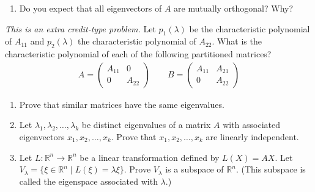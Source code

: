 \documentclass[12pt]{article}
\theoremstyle{remark}
\newtheorem*{solution}{Solution}
\newcommand{\R}{\mathbb{R}}
\renewcommand{\=}{&=&}
\newcommand{\<}{\langle}
\renewcommand{\>}{\rangle}
\newcommand{\bmat}{\begin{pmatrix}}
\newcommand{\emat}{\end{pmatrix}}
\newcommand{\beq}{\begin{eqnarray*}}
\newcommand{\eeq}{\end{eqnarray*}}
\begin{document}
\begin{problems}
\begin{enumerate}
	
	\item Do you expect that all eigenvectors of $A$ are mutually orthogonal? Why?
	
\end{enumerate}



\item
\emph{This is an extra credit-type problem.}
Let $p_1(\lambda)$ be the characteristic polynomial of $A_{11}$ and $p_2(\lambda)$ the
characteristic polynomial of $A_{22}$. What is the characteristic polynomial of each of the
following partitioned matrices?
\beq
	A = \bmat A_{11} & 0 \\ 0 & A_{22} \emat \qquad
	B = \bmat A_{11} & A_{21} \\ 0 & A_{22} \emat
\eeq





\item 
\begin{enumerate}
	\item Prove that similar matrices have the same eigenvalues.
	
	
	\item Let $\lambda_1, \lambda_2, \ldots, \lambda_k$ be distinct eigenvalues of a matrix
	$A$ with associated eigenvectors $x_1, x_2, \ldots, x_k$. Prove that $x_1, x_2, \ldots,
	x_k$ are linearly independent.
	
	
	\item Let $L:\R^n \to \R^n$ be a linear transformation defined by $L(X) = AX$. Let
	$V_\lambda = \{\xi \in \R^n \mid L(\xi) = \lambda \xi\}$. Prove $V_\lambda$ is a subspace
	of $\R^n$. (This subspace is called the eigenspace associated with $\lambda$.)
	

\end{enumerate}
\end{problems}
\end{document}

